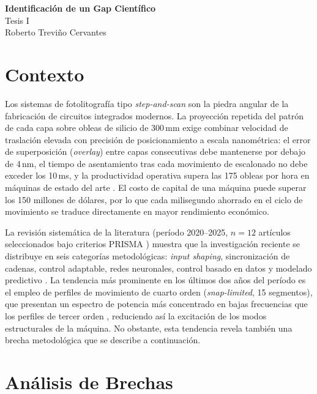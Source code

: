 \documentclass[11pt]{article}
\theoremstyle{definition}
\begin{document}
\setcounter{section}{0}

\thispagestyle{empty}

\begin{center}
{\LARGE \bf Identificación de un Gap Científico}\\[4pt]
{\large Tesis I}\\[2pt]
Roberto Treviño Cervantes
\end{center}

\section{Contexto}

Los sistemas de fotolitografía tipo \textit{step-and-scan} son la piedra angular de la fabricación de circuitos integrados modernos. La proyección repetida del patrón de cada capa sobre obleas de silicio de 300\,mm exige combinar velocidad de traslación elevada con precisión de posicionamiento a escala nanométrica: el error de superposición (\textit{overlay}) entre capas consecutivas debe mantenerse por debajo de 4\,nm, el tiempo de asentamiento tras cada movimiento de escalonado no debe exceder los 10\,ms, y la productividad operativa supera las 175 obleas por hora en máquinas de estado del arte \supercite{Butler2011_PositionControl, Schmidt2012_UltraPrecision}. El costo de capital de una máquina puede superar los 150 millones de dólares, por lo que cada milisegundo ahorrado en el ciclo de movimiento se traduce directamente en mayor rendimiento económico.

La revisión sistemática de la literatura (período 2020--2025, $n=12$ artículos seleccionados bajo criterios PRISMA \supercite{Page2021_PRISMA}) muestra que la investigación reciente se distribuye en seis categorías metodológicas: \textit{input shaping}, sincronización de cadenas, control adaptable, redes neuronales, control basado en datos y modelado predictivo \supercite{Song2021_Review, Heertjes2020_Control}. La tendencia más prominente en los últimos dos años del período es el empleo de perfiles de movimiento de cuarto orden (\textit{snap-limited}, 15 segmentos), que presentan un espectro de potencia más concentrado en bajas frecuencias que los perfiles de tercer orden \supercite{Al-Rawashdeh2023a}, reduciendo así la excitación de los modos estructurales de la máquina. No obstante, esta tendencia revela también una brecha metodológica que se describe a continuación.

\section{Análisis de Brechas}
\end{document}

